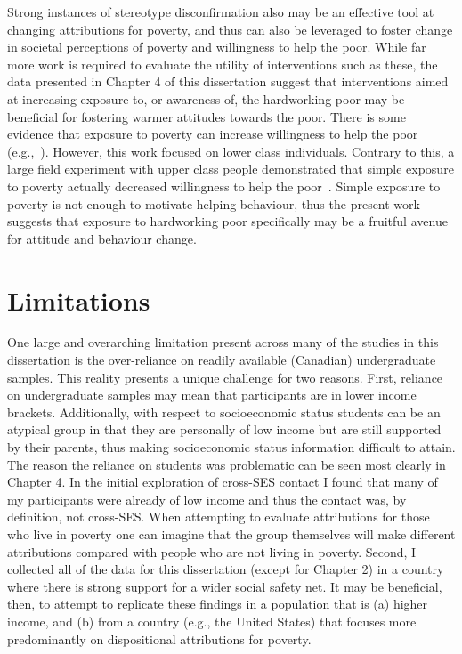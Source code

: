 \documentclass{sfuthesis}
\begin{document}
Strong instances of stereotype disconfirmation also may be an effective tool at changing attributions for poverty, and thus can also be leveraged to foster change in societal perceptions of poverty and willingness to help the poor. While far more work is required to evaluate the utility of interventions such as these, the data presented in Chapter 4 of this dissertation suggest that interventions aimed at increasing exposure to, or awareness of, the hardworking poor may be beneficial for fostering warmer attitudes towards the poor. There is some evidence that exposure to poverty can increase willingness to help the poor (e.g.,~\cite{piff10}). However, this work focused on lower class individuals. Contrary to this, a large field experiment with upper class people demonstrated that simple exposure to poverty actually decreased willingness to help the poor~\cite{sands17}. Simple exposure to poverty is not enough to motivate helping behaviour, thus the present work suggests that exposure to hardworking poor specifically may be a fruitful avenue for attitude and behaviour change.

\section{Limitations}

One large and overarching limitation present across many of the studies in this dissertation is the over-reliance on readily available (Canadian) undergraduate samples. This reality presents a unique challenge for two reasons. First, reliance on undergraduate samples may mean that participants are in lower income brackets. Additionally, with respect to socioeconomic status students can be an atypical group in that they are personally of low income but are still supported by their parents, thus making socioeconomic status information difficult to attain. The reason the reliance on students was problematic can be seen most clearly in Chapter 4. In the initial exploration of cross-SES contact I found that many of my participants were already of low income and thus the contact was, by definition, not cross-SES. When attempting to evaluate attributions for those who live in poverty one can imagine that the group themselves will make different attributions compared with people who are not living in poverty. Second, I collected all of the data for this dissertation (except for Chapter 2) in a country where there is strong support for a wider social safety net. It may be beneficial, then, to attempt to replicate these findings in a population that is (a) higher income, and (b) from a country (e.g., the United States) that focuses more predominantly on dispositional attributions for poverty.
\end{document}
